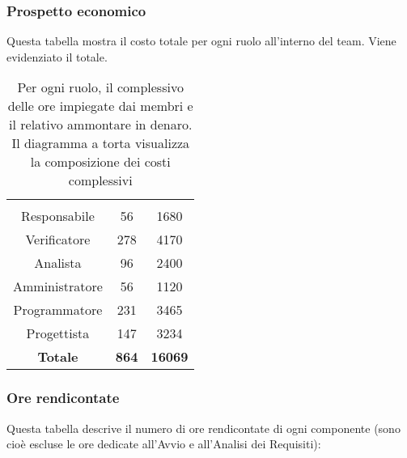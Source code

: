 \subsubsection{Prospetto economico}
Questa tabella mostra il costo totale per ogni ruolo all'interno del team. Viene evidenziato il totale.

\begin{table}[H]
	{\setlength{\parindent}{0cm}
		\begin{minipage}{.43\textwidth}
			\begin{tabular}{ccc}
				\rowcolorhead
				\headertitle{Ruolo} & \headertitle{Ore} & \headertitle{Costo(\euro{})}\\
				Responsabile & 56 & 1680\\
				Verificatore & 278 & 4170\\
				Analista & 96 & 2400\\
				Amministratore & 56 & 1120\\
				Programmatore & 231 & 3465\\
				Progettista & 147 & 3234\\
				\hline
				\textbf{Totale} & \textbf{864} & \textbf{16069}\\
			\end{tabular}
		\end{minipage}%
		\begin{minipage}{.57\textwidth}
	\end{minipage} }
	\caption[Prospetto economico complessivo]{Per ogni ruolo, il complessivo delle ore impiegate dai membri e il relativo ammontare in denaro. Il diagramma a torta visualizza la composizione dei costi complessivi}
\end{table}


\subsubsection{Ore rendicontate}


Questa tabella descrive il numero di ore rendicontate di ogni componente (sono cioè escluse le ore dedicate all'Avvio e all'Analisi dei Requisiti):


